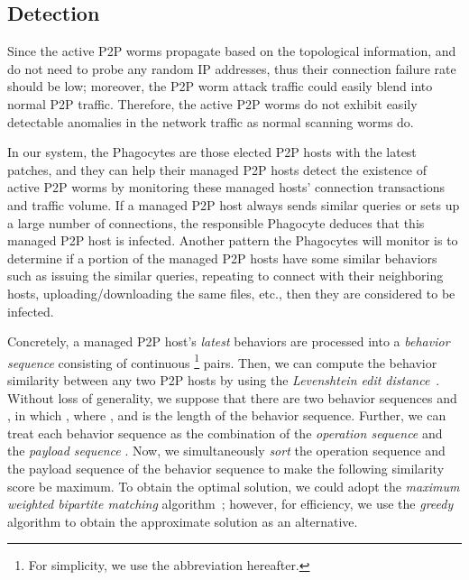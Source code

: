\documentclass[times,10pt,twocolumn]{article}
\begin{document}
\subsection{Detection}
\label{subsec:detection}

Since the active P2P worms propagate based on the topological
information, and do not need to probe any random IP addresses, thus
their connection failure rate should be low; moreover, the P2P worm
attack traffic could easily blend into normal P2P traffic.
Therefore, the active P2P worms do not exhibit easily detectable
anomalies in the network traffic as normal scanning worms do.




In our system, the Phagocytes are those elected P2P hosts with the
latest patches, and they can help their managed P2P hosts detect the
existence of active P2P worms by monitoring these managed hosts'
connection transactions and traffic volume. If a managed P2P host
always sends similar queries or sets up a large number of
connections, the responsible Phagocyte deduces that this managed P2P
host is infected. Another pattern the Phagocytes will monitor is to
determine if a portion of the managed P2P hosts have some similar
behaviors such as issuing the similar queries, repeating to connect
with their neighboring hosts, uploading/downloading the same files,
etc., then they are considered to be infected.





Concretely, a managed P2P host's \emph{latest} behaviors are
processed into a \emph{behavior sequence} consisting of continuous
\footnote{For simplicity, we use
the abbreviation  hereafter.} pairs. Then, we
can compute the behavior similarity between any two P2P hosts by
using the \emph{Levenshtein edit distance}~\cite{Levenshtein66}.
Without loss of generality, we suppose that there are two behavior
sequences  and , in which , where , and  is the length of the behavior sequence. Further, we
can treat each behavior sequence  as the combination of the
\emph{operation sequence}  and the \emph{payload sequence} . Now, we
simultaneously \emph{sort} the operation sequence  and the
payload sequence  of the behavior sequence  to make the
following similarity score  be maximum.
To obtain the optimal solution, we could adopt the \emph{maximum
weighted bipartite matching} algorithm~\cite{graph00}; however, for
efficiency, we use the \emph{greedy} algorithm to obtain the
approximate solution as an alternative.
\end{document}
